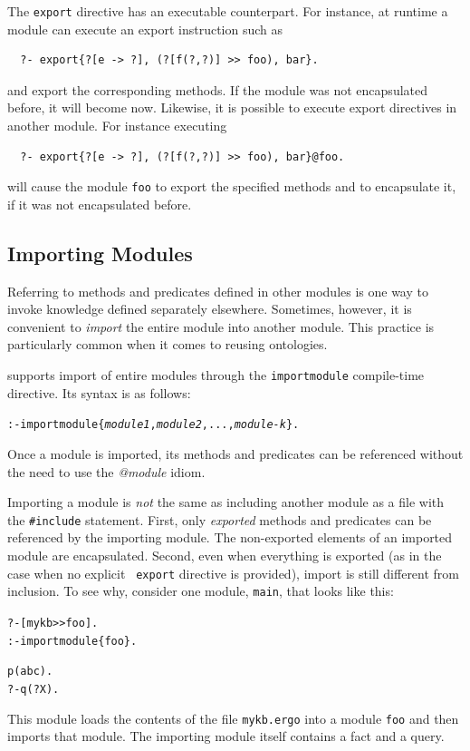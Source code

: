 \documentclass[11pt]{article}
\newcommand{\ERGO}{\mbox{\smaller{\ensuremath{\cal{E}}\smaller{{\sc{RGO}}}}}\xspace}
\newcommand{\FLSYSTEM}{\ERGO}
\newcommand{\ergoext}{ergo\xspace}
\begin{document}
The {\tt export} directive has an executable counterpart. For instance, at
runtime a module can execute an export instruction such as 
\begin{verbatim}
  ?- export{?[e -> ?], (?[f(?,?)] >> foo), bar}.
\end{verbatim}
and export the corresponding methods. If the module was not encapsulated
before, it will become now. Likewise, it is possible to execute export
directives in another module. For instance executing
\begin{verbatim}
  ?- export{?[e -> ?], (?[f(?,?)] >> foo), bar}@foo.
\end{verbatim}
will cause the module {\tt foo} to export the specified methods and to
encapsulate it, if it was not encapsulated before. 


\subsection{Importing Modules}\label{sec-module-import}

Referring to methods and predicates defined in other modules is one way to
invoke knowledge defined separately elsewhere. Sometimes, however,
it is convenient to \emph{import} the entire module into another module.
This practice is particularly common when it comes to reusing ontologies.

\FLSYSTEM supports import of entire modules through the {\tt importmodule}
compile-time directive. Its syntax is as follows:

\begin{alltt}
 :- importmodule\{\textit{module1}, \textit{module2}, ..., \textit{module-k}\}.
\end{alltt}

Once a module is imported, its methods and predicates can be referenced
without the need to use the \emph{@module} idiom. 

Importing a module is \emph{not} the same as including another module as a
file with the {\tt \#include} statement. First, only \emph{exported}
methods and predicates can be referenced by the importing module.
The non-exported elements of an imported module are encapsulated.
Second,
even when everything is exported (as in the case when no explicit {\tt
  export} directive is provided), import is still different from inclusion.
To see why, consider one module, {\tt main}, that looks like this:

\begin{alltt}
  ?- [mykb>{}>foo].
  :- importmodule\{foo\}.

  p(abc).
  ?- q(?X).
\end{alltt}
This module loads the contents of the file {\tt mykb.\ergoext} into a module
{\tt foo} and then imports that module.  
The importing module itself contains a fact and a query.
\end{document}
